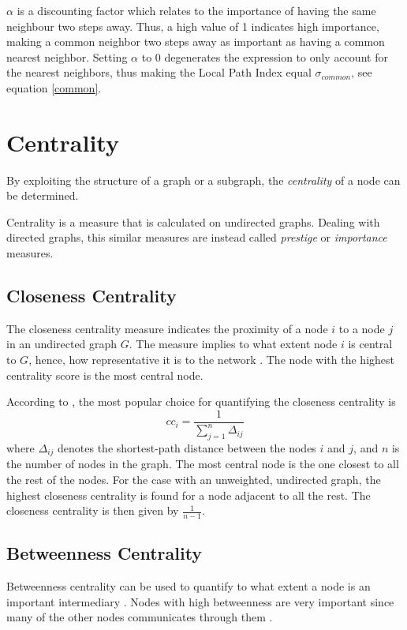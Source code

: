 $\alpha$ is a discounting factor which relates to the importance of having the same neighbour two steps away. Thus, a high value of 1 indicates high importance, making a common neighbor two steps away as important as having a common nearest neighbor. Setting $\alpha$ to 0 degenerates the expression to only account for the nearest neighbors, thus making the Local Path Index equal $\sigma_{common}$, see equation \eqref{common}.

\section{Centrality}
By exploiting the structure of a graph or a subgraph, the \textit{centrality} of a node can be determined. 

Centrality is a measure that is calculated on undirected graphs. Dealing with directed graphs, this similar measures are instead called \textit{prestige} or \textit{importance} measures. \cite{fouss2016algorithms}


\subsection{Closeness Centrality}
The closeness centrality measure indicates the proximity of a node $i$ to a node $j$ in an undirected graph $G$. The measure implies to what extent node $i$ is central to $G$, hence, how representative it is to the network \citep{fouss2016algorithms}. The node with the highest centrality score is the most central node.

According to \citet{fouss2016algorithms}, the most popular choice for quantifying the closeness centrality is
\begin{equation}
    cc_i=\frac{1}{\sum_{j=1}^{n} \Delta_{ij}}
\end{equation}
where $\Delta_{ij}$ denotes the shortest-path distance between the nodes $i$ and $j$, and $n$ is the number of nodes in the graph. The most central node is the one closest to all the rest of the nodes. For the case with an unweighted, undirected graph, the highest closeness centrality is found for a node adjacent to all the rest. The closeness centrality is then given by $\frac{1}{n-1}$.

\subsection{Betweenness Centrality}
Betweenness centrality can be used to quantify to what extent a node is an important intermediary \citep{fouss2016algorithms}. Nodes with high betweenness are very important since many of the other nodes communicates through them \citep{Kajdanowicz2013}. 


